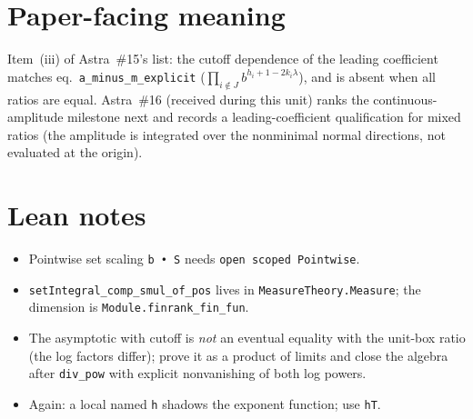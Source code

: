 \documentclass[11pt]{article}
\begin{document}
\section{Paper-facing meaning}
Item~(iii) of Astra~\#15's list: the cutoff dependence of the leading coefficient matches
eq.~\texttt{a\_minus\_m\_explicit} ($\prod_{i\notin J}b^{h_i+1-2k_i\lambda}$), and is absent when all
ratios are equal. Astra~\#16 (received during this unit) ranks the continuous-amplitude milestone
next and records a leading-coefficient qualification for mixed ratios (the amplitude is integrated
over the nonminimal normal directions, not evaluated at the origin).

\section{Lean notes}
\begin{itemize}
\item Pointwise set scaling \texttt{b • S} needs \texttt{open scoped Pointwise}.
\item \texttt{setIntegral\_comp\_smul\_of\_pos} lives in \texttt{MeasureTheory.Measure}; the
dimension is \texttt{Module.finrank\_fin\_fun}.
\item The asymptotic with cutoff is \emph{not} an eventual equality with the unit-box ratio (the log
factors differ); prove it as a product of limits and close the algebra after \texttt{div\_pow} with
explicit nonvanishing of both log powers.
\item Again: a local named \texttt{h} shadows the exponent function; use \texttt{hT}.
\end{itemize}
\end{document}
